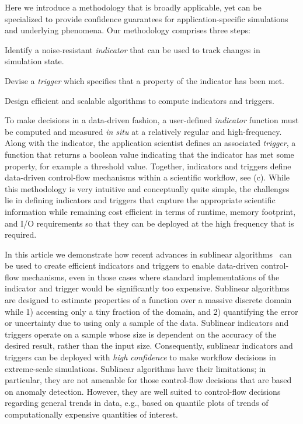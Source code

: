 \documentclass[final]{siamltex}
\begin{document}
Here we introduce a methodology that is broadly applicable, yet can
be specialized to provide confidence guarantees for application-specific simulations and
underlying phenomena. 
Our methodology comprises three steps:  
\begin{compactenum} 
\item  Identify a noise-resistant \emph{indicator} that can be used to track changes in
  simulation state. 
\item  Devise a \emph{trigger} which specifies that a property of the indicator has been met.  
 \item  Design efficient and scalable algorithms to compute indicators and triggers.
 \end{compactenum} 
To make decisions in a data-driven
fashion, a user-defined \emph{indicator} function must be computed and measured \emph{in situ} 
at a relatively regular and high-frequency.  Along with the indicator, the application scientist
defines an associated \emph{trigger}, a function that returns a boolean value
indicating that the indicator has met some property, for example a threshold
value.  Together, indicators and triggers define data-driven control-flow
mechanisms within a scientific workflow, see (c).  While this 
methodology is very intuitive and conceptually quite simple,
the challenges lie in defining indicators and triggers that capture the appropriate
scientific information while remaining cost efficient in terms of runtime, memory footprint, and I/O
requirements so that they can be deployed at the high frequency that is
required.  

In this article we demonstrate how recent advances in sublinear
algorithms~\cite{FischerSurvey,RonSurvey, RubSurvey} can be used to create efficient
indicators and triggers to enable data-driven control-flow mechanisms,
even in those cases where standard implementations of the
indicator and trigger would be significantly too expensive.  Sublinear algorithms are designed to estimate 
properties of a function over a massive discrete domain while 1) accessing 
only a tiny fraction of the domain, and 2) quantifying the error or uncertainty 
due to using only a sample of the data.  Sublinear indicators and triggers
operate on a sample whose size is dependent on the accuracy
of the desired result, rather than the input size. Consequently, sublinear
indicators and triggers can be deployed with \emph{high confidence} to 
make workflow decisions in extreme-scale simulations.  Sublinear
algorithms have their limitations;  in particular, they are not amenable for those control-flow
decisions that are based on anomaly detection.  However, they are well suited
to control-flow decisions regarding general trends in data, e.g., based on 
quantile plots of trends of computationally expensive quantities of interest. 
\end{document}
